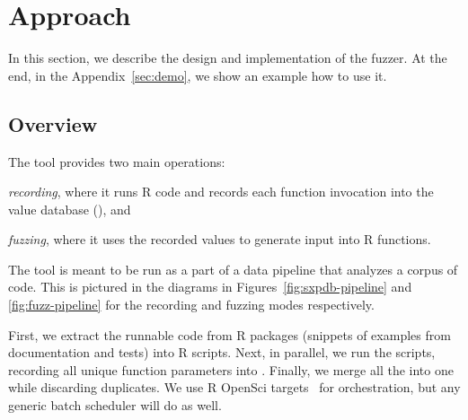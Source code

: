 \documentclass[sigplan,anonymous,review]{acmart}
\begin{document}

\section{Approach}
\label{sec:fuzzy}

In this section, we describe the design and implementation of the \tool fuzzer.
At the end, in the Appendix~\ref{sec:demo}, we show an example how to use it.

\subsection{Overview}

The tool provides two main operations:
%
\begin{inparaenum}[(1)]
\item \emph{recording}, where it runs R code and records each function invocation into the value database (\sxpdb), and
\item \emph{fuzzing}, where it uses the recorded values to generate input into R functions. 
\end{inparaenum}
%
The tool is meant to be run as a part of a data pipeline that analyzes a corpus of code.
This is pictured in the diagrams in Figures~\ref{fig:sxpdb-pipeline} and \ref{fig:fuzz-pipeline} for the recording and fuzzing modes respectively.

First, we extract the runnable code from R packages (snippets of examples from documentation and tests) into R scripts.
Next, in parallel, we run the scripts, recording all unique function parameters into \sxpdb.
Finally, we merge all the \sxpdb into one while discarding duplicates.
We use R OpenSci targets~\cite{landau2021_targets} for orchestration, but any generic batch scheduler will do as well.
\end{document}
